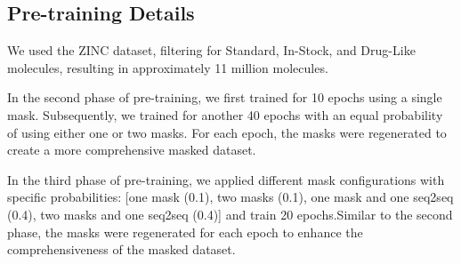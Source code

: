{\subsection{Pre-training Details}\label{app:training_detail}


We used the ZINC dataset, filtering for Standard, In-Stock, and Drug-Like molecules, resulting in approximately 11 million molecules.

In the second phase of pre-training, we first trained for 10 epochs using a single mask. Subsequently, we trained for another 40 epochs with an equal probability of using either one or two masks. For each epoch, the masks were regenerated to create a more comprehensive masked dataset.

In the third phase of pre-training, we applied different mask configurations with specific probabilities: [one mask (0.1), two masks (0.1), one mask and one seq2seq (0.4), two masks and one seq2seq (0.4)] and train 20 epochs.Similar to the second phase, the masks were regenerated for each epoch to enhance the comprehensiveness of the masked dataset.}



